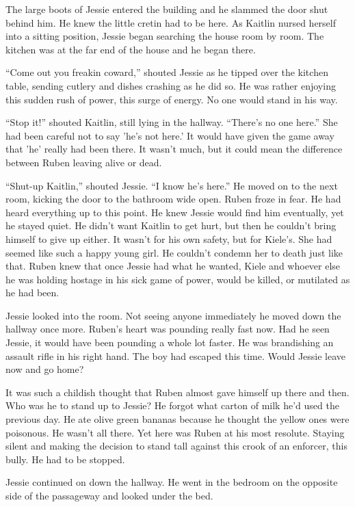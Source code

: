 The large boots of Jessie entered the building and he slammed the door shut behind him.  He knew the little cretin had to be here.  As Kaitlin nursed herself into a sitting position, Jessie began searching the house room by room.  The kitchen was at the far end of the house and he began there.  

``Come out you freakin coward,'' shouted Jessie as he tipped over the kitchen table, sending cutlery and dishes crashing as he did so.  He was rather enjoying this sudden rush of power, this surge of energy.  No one would stand in his way.  

``Stop it!'' shouted Kaitlin, still lying in the hallway.  ``There's no one here.''  She had been careful not to say 'he's not here.'  It would have given the game away that 'he' really had been there.  It wasn't much, but it could mean the difference between Ruben leaving alive or dead.

``Shut-up Kaitlin,'' shouted Jessie.  ``I know he's here.''  He moved on to the next room, kicking the door to the bathroom wide open.  Ruben froze in fear.  He had heard everything up to this point.  He knew Jessie would find him eventually, yet he stayed quiet.  He didn't want Kaitlin to get hurt, but then he couldn't bring himself to give up either.  It wasn't for his own safety, but for Kiele's.  She had seemed like such a happy young girl.  He couldn't condemn her to death just like that.  Ruben knew that once Jessie had what he wanted, Kiele and whoever else he was holding hostage in his sick game of power, would be killed, or mutilated as he had been.

Jessie looked into the room.  Not seeing anyone immediately he moved down the hallway once more.  Ruben's heart was pounding really fast now.  Had he seen Jessie, it would have been pounding a whole lot faster.  He was brandishing an assault rifle in his right hand.    The boy had escaped this time.  Would Jessie leave now and go home?  

It was such a childish thought that Ruben almost gave himself up there and then.  Who was he to stand up to Jessie?  He forgot what carton of milk he'd used the previous day.  He ate olive green bananas because he thought the yellow ones were poisonous.  He wasn't all there.  Yet here was Ruben at his most resolute.  Staying silent and making the decision to stand tall against this crook of an enforcer, this bully.  He had to be stopped.

Jessie continued on down the hallway.  He went in the bedroom on the opposite side of the passageway and looked under the bed.

